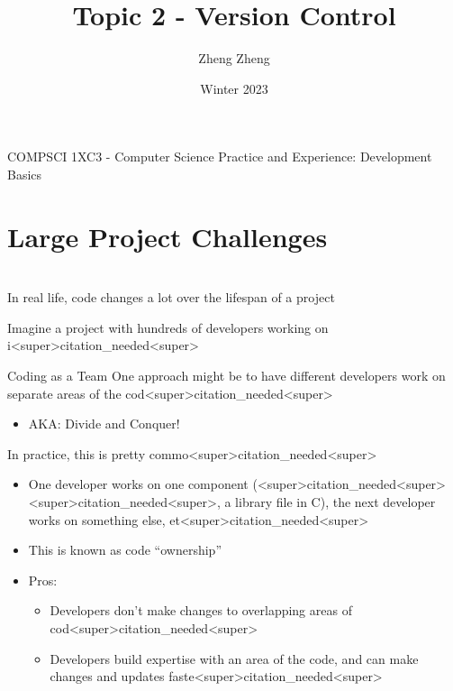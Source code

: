 \documentclass[11pt]{beamer}
\author{Zheng Zheng}
\title{Topic 2 - Version Control}
\institute{McMaster University}
\date{Winter 2023}
\begin{document}
\begin{frame}
\center
COMPSCI 1XC3 - Computer Science Practice and Experience:
Development Basics
\titlepage
\end{frame}

\begin{frame}
\tableofcontents
\end{frame}

\section[Motivation]{Large Project Challenges}
\begin{frame}
\center
\ \\
In real life, code changes a lot over the lifespan of a project
\end{frame}

\begin{frame}
\center
Imagine a project with hundreds of developers working on i<super>citation_needed<super>
\ \\
\end{frame}

\begin{frame}{Coding as a Team}
One approach might be to have different developers work on separate areas of the cod<super>citation_needed<super>
\begin{itemize}
\item AKA: Divide and Conquer!
\end{itemize}
In practice, this is pretty commo<super>citation_needed<super>
\begin{itemize}
\item One developer works on one component (<super>citation_needed<super><super>citation_needed<super>, a library file in C), the next developer works on something else, et<super>citation_needed<super>
\item This is known as code ``ownership''
\item Pros:
\begin{itemize}
\item Developers don't make changes to overlapping areas of cod<super>citation_needed<super> 
\item Developers build expertise with an area of the code, and can make changes and updates faste<super>citation_needed<super>
\end{itemize}
\end{itemize}
\end{frame}
\end{document}
